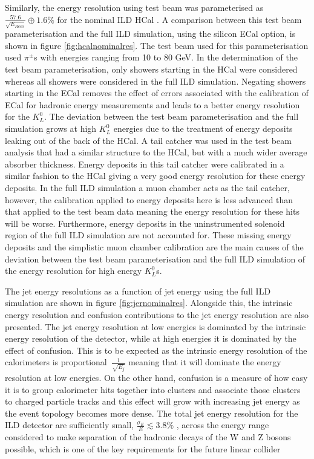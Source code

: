 Similarly, the energy resolution using test beam was parameterised as $\frac{57.6}{\sqrt{E_{Reco}}} \oplus 1.6 \%$ for the nominal ILD HCal \cite{Adloff:2012gv}.  A comparison between this test beam parameterisation and the full ILD simulation, using the silicon ECal option, is shown in figure \ref{fig:hcalnominalres}.  The test beam used for this parameterisation used $\pi^{\pm}$s with energies ranging from 10 to 80 GeV.  In the determination of the test beam parameterisation, only showers starting in the HCal were considered whereas all showers were considered in the full ILD simulation.  Negating showers starting in the ECal removes the effect of errors associated with the calibration of ECal for hadronic energy measurements and leads to a better energy resolution for the $K^{0}_{L}$.  The deviation between the test beam parameterisation and the full simulation grows at high $K^{0}_{L}$ energies due to the treatment of energy deposits leaking out of the back of the HCal.  A tail catcher was used in the test beam analysis that had a similar structure to the HCal, but with a much wider average absorber thickness.  Energy deposits in this tail catcher were calibrated in a similar fashion to the HCal giving a very good energy resolution for these energy deposits.  In the full ILD simulation a muon chamber acts as the tail catcher, however, the calibration applied to energy deposits here is less advanced than that applied to the test beam data meaning the energy resolution for these hits will be worse.  Furthermore, energy deposits in the uninstrumented solenoid region of the full ILD simulation are not accounted for.  These missing energy deposits and the simplistic muon chamber calibration are the main causes of the deviation between the test beam parameterisation and the full ILD simulation of the energy resolution for high energy $K^{0}_{L}$s.   

The jet energy resolutions as a function of jet energy using the full ILD simulation are shown in figure \ref{fig:jernominalres}.  Alongside this, the intrinsic energy resolution and confusion contributions to the jet energy resolution are also presented.  The jet energy resolution at low energies is dominated by the intrinsic energy resolution of the detector, while at high energies it is dominated by the effect of confusion.  This is to be expected as the intrinsic energy resolution of the calorimeters is proportional $~\frac{1}{\sqrt{E_{j}}}$ meaning that it will dominate the energy resolution at low energies.  On the other hand, confusion is a measure of how easy it is to group calorimeter hits together into clusters and associate those clusters to charged particle tracks and this effect will grow with increasing jet energy as the event topology becomes more dense.  The total jet energy resolution for the ILD detector are sufficiently small, $\frac{\sigma_{E}}{E} \lesssim 3.8\%$ \cite{Behnke:2013lya, arXiv:0907.3577, Linssen:2012hp},  across the energy range considered to make separation of the hadronic decays of the W and Z bosons possible, which is one of the key requirements for the future linear collider

